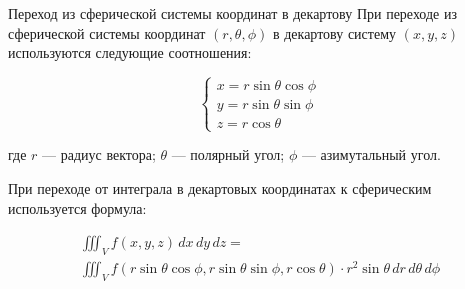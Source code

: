 \documentclass{beamer}
\begin{document}
	\begin{frame}{Переход из сферической системы координат в декартову}{}
		При переходе из сферической системы координат $(r, \theta, \phi)$ в декартову систему $(x, y, z)$ используются следующие соотношения:

		\[
			\begin{cases}
			x = r \sin \theta \cos \phi \\
			y = r \sin \theta \sin \phi \\
			z = r \cos \theta
			\end{cases}
		\]

		где
		$r$ --- радиус вектора;
		$\theta$ --- полярный угол;
		$\phi$ --- азимутальный угол.

		При переходе от интеграла в декартовых координатах к сферическим используется формула:

		\[
			\begin{align*}
			\iiint_V f(x, y, z) \, dx \, dy \, dz = \\
			\iiint_V f(r \sin \theta \cos \phi, r \sin \theta \sin \phi, r \cos \theta) \cdot r^2 \sin \theta \, dr \, d\theta \, d\phi
			\end{align*}
		\]

	\end{frame}
\end{document}
